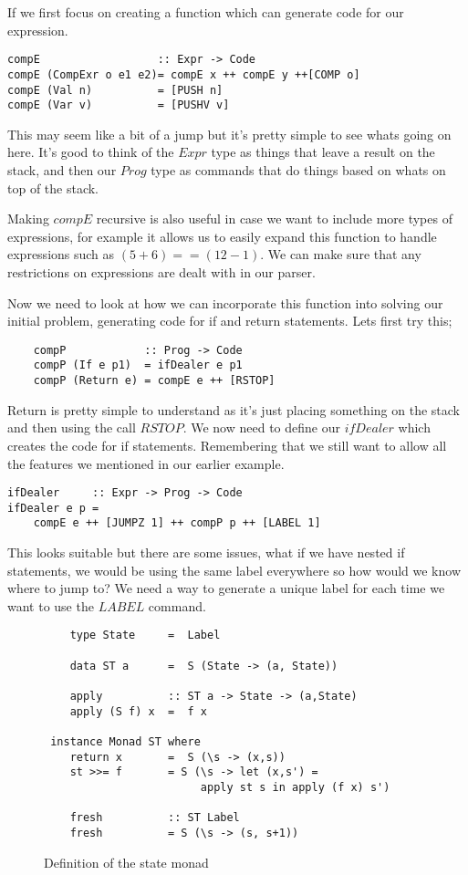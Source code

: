 If we first focus on creating a function which can generate code for our expression.

\begin{lstlisting}
compE                  :: Expr -> Code
compE (CompExr o e1 e2)= compE x ++ compE y ++[COMP o]
compE (Val n)          = [PUSH n]
compE (Var v)          = [PUSHV v]
\end{lstlisting}  

This may seem like a bit of a jump but it's pretty simple to see whats going on here. It's good to think of the $Expr$ type as things that leave a result on the stack, and then our $Prog$ type as commands that do things based on whats on top of the stack.

Making $compE$ recursive is also useful in case we want to include more types of expressions, for example it allows us to easily expand this function to handle expressions such as $(5 + 6) == (12 - 1)$. We can make sure that any restrictions on expressions are dealt with in our parser. 

Now we need to look at how we can incorporate this function into solving our initial problem, generating code for if and return statements. Lets first try this; 

\begin{lstlisting}
	compP            :: Prog -> Code 
	compP (If e p1)  = ifDealer e p1  
	compP (Return e) = compE e ++ [RSTOP] 
\end{lstlisting}

Return is pretty simple to understand as it's just placing something on the stack and then using the call $RSTOP$. We now need to define our $ifDealer$ which creates the code for if statements. Remembering that we still want to allow all the features we mentioned in our earlier example.

\begin{lstlisting}
ifDealer     :: Expr -> Prog -> Code 
ifDealer e p = 
	compE e ++ [JUMPZ 1] ++ compP p ++ [LABEL 1]
\end{lstlisting}

This looks suitable but there are some issues, what if we have nested if statements, we would be using the same label everywhere so how would we know where to jump to? We need a way to generate a unique label for each time we want to use the $LABEL$ command.

\begin{figure}[h]
\centering
\begin{lstlisting}
    type State 	   =  Label

    data ST a 	   =  S (State -> (a, State))

    apply          :: ST a -> State -> (a,State)
    apply (S f) x  =  f x

 instance Monad ST where
    return x       =  S (\s -> (x,s))
    st >>= f   	   = S (\s -> let (x,s') = 
                        apply st s in apply (f x) s')

    fresh          :: ST Label
    fresh          = S (\s -> (s, s+1))

\end{lstlisting}
\caption{Definition of the state monad}
\label{fig:stMonad}
\end{figure}  

